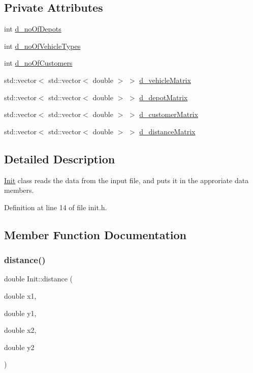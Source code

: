 \subsection*{Private Attributes}
\begin{DoxyCompactItemize}
\item 
int \hyperlink{class_init_a44d05451df796d69ecc558837ecb7105}{d\+\_\+no\+Of\+Depots}
\item 
int \hyperlink{class_init_a636841b2dccedbe95e966d59452c4585}{d\+\_\+no\+Of\+Vehicle\+Types}
\item 
int \hyperlink{class_init_ab31f6ee0c02edc45d78d0e90a89ba45a}{d\+\_\+no\+Of\+Customers}
\item 
std\+::vector$<$ std\+::vector$<$ double $>$ $>$ \hyperlink{class_init_a3d56c67f9c6ba79f0fc2252bbc964345}{d\+\_\+vehicle\+Matrix}
\item 
std\+::vector$<$ std\+::vector$<$ double $>$ $>$ \hyperlink{class_init_a3472bd129b55c09b49cfcccae49b7d6b}{d\+\_\+depot\+Matrix}
\item 
std\+::vector$<$ std\+::vector$<$ double $>$ $>$ \hyperlink{class_init_a17dd120f45612ac00015ab0650025afc}{d\+\_\+customer\+Matrix}
\item 
std\+::vector$<$ std\+::vector$<$ double $>$ $>$ \hyperlink{class_init_a602b213bdcdaecbaa1ebfb134930ad33}{d\+\_\+distance\+Matrix}
\end{DoxyCompactItemize}


\subsection{Detailed Description}
\hyperlink{class_init}{Init} class reads the data from the input file, and puts it in the approriate data members. 

Definition at line 14 of file init.\+h.



\subsection{Member Function Documentation}
\mbox{\label{class_init_a99ac0859d92852b421f4fc13973d9a70}} 
\subsubsection{\texorpdfstring{distance()}{distance()}}
{\footnotesize\ttfamily double Init\+::distance (\begin{DoxyParamCaption}\item[{double}]{x1,  }\item[{double}]{y1,  }\item[{double}]{x2,  }\item[{double}]{y2 }\end{DoxyParamCaption})\hspace{0.3cm}{\ttfamily [private]}}



